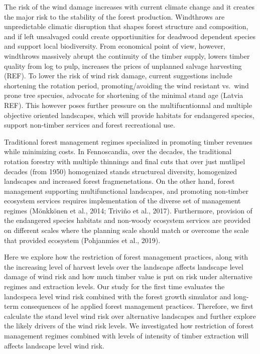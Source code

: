 \documentclass[]{elsarticle} %
\begin{document}
The risk of the wind damage increases with current climate change and it creates the major risk to the stability of the forest production. Windthrows are unpredictable climatic disruption that shapes forest structure and composition, and if left unsalvaged could create opportiunities for deadwood dependent species and support local biodiversity. From economical point of view, however, windthrows massively abrupt the continuity of the timber supply, lowers timber quality from log to pulp, increases the prices of unplanned salvage harvesting (REF). To lower the risk of wind risk damage, current suggestions include shortening the rotation period, promoting/avoiding the wind resistant vs.~wind prone tree specuies, advocate for shortening of the minimal stand age (Latvia REF). This however poses further pressure on the multifucntionnal and multiple objective oriented landscapes, which will provide habitats for endangered species, support non-timber services and forest recreational use.

Traditional forest management regimes specialized in promoting timber revenues while minimizing costs. In Fennoscandia, over the decades, the traditional rotation forestry with multiple thinnings and final cuts that over just mutlipel decades (from 1950) homogenized stands structureal diversity, homogenized landscapes and increased forest fragmenetations. On the other hand, forest management supporting multifunctional landscapes, and promoting non-timber ecosystem services requires implementation of the diverse set of management regimes (Mönkkönen et al., 2014; Triviño et al., 2017). Furthermore, provision of the endangered species habitats and non-woody ecosystem services are provided on different scales where the planning scale should match or overcome the scale that provided ecosystem (Pohjanmies et al., 2019).

Here we explore how the restriction of forest management practices, along with the increasing level of harvest levels over the landscape affects landscape level damage of wind risk and how much timber value is put on risk under alternative regimes and extraction levels. Our study for the first time evaluates the landcspeca level wind risk combined with the forest growth simulator and long-term consequences of he applied forest management practices. Therefore, we first calculate the stand level wind risk over alternative landscapes and further explore the likely drivers of the wind risk levels. We investigated how restriction of forest management regimes combined with levels of intensity of timber extraction will affects landscape level wind risk.
\end{document}
